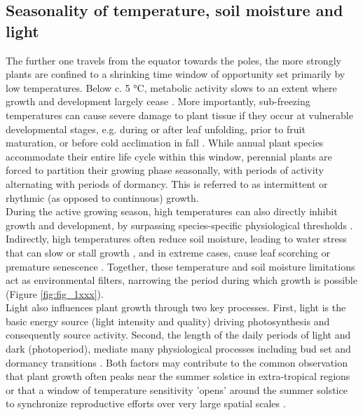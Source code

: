 \documentclass{article}
\begin{document}
	\subsection*{Seasonality of temperature, soil moisture and light}
		The further one travels from the equator towards the poles, the more strongly plants are confined to a shrinking time window of opportunity set primarily by low temperatures. Below c. 5 °C, metabolic activity slows to an extent where growth and development largely cease \citep{schenkerPhysiologicalMinimumTemperatures2014, rossiCriticalTemperaturesXylogenesis2008, kornerWinterCropGrowth2008}. More importantly, sub-freezing temperatures can cause severe damage to plant tissue if they occur at vulnerable developmental stages, e.g. during or after leaf unfolding, prior to fruit maturation, or before cold acclimation in fall \citep{sakaiFreezingInjuriesPlants1987c, baumgartenNoRiskNo2023a}. 
		While annual plant species accommodate their entire life cycle within this window, perennial plants are forced to partition their growing phase seasonally, with periods of activity alternating with periods of dormancy. This is referred to as intermittent or rhythmic (as opposed to continuous) growth. \\

		During the active growing season, high temperatures can also directly inhibit growth and development, by surpassing species-specific physiological thresholds \citep{osullivanThermalLimitsLeaf2017}. Indirectly, high temperatures often reduce soil moisture, leading to water stress that can slow or stall growth \citep{hsiaoPlantResponsesWater1973, pugnaireConstraintsWaterStress1999, etzoldNumberGrowthDays2021}, and in extreme cases, cause leaf scorching or premature senescence \citep{estiarteAlterationPhenologyLeaf2015a}. Together, these temperature and soil moisture limitations act as environmental filters, narrowing the period during which growth is possible (Figure \ref{fig:fig_1xxx}).  \\
		
		Light also influences plant growth through two key processes. First, light is the basic energy source (light intensity and quality) driving photosynthesis and consequently source activity. Second, the length of the daily periods of light and dark (photoperiod), mediate many physiological processes including bud set and dormancy transitions \citep{wangPlantsDistinguishDifferent2024b}. Both factors may contribute to the common observation that plant growth often peaks near the summer solstice in extra-tropical regions \citep{rossiConifersColdEnvironments2006, etzoldNumberGrowthDays2021, luoSummerSolsticeMarks2018} or that a window of temperature sensitivity 'opens’ around the summer solstice to synchronize reproductive efforts over very large spatial scales \citep{journeSummerSolsticeOrchestrates2024}.
		
\end{document}
